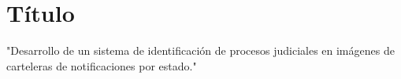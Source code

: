 \chapter{T\'itulo}
\label{sec:titulo}

"Desarrollo de un sistema de identificaci\'on de procesos judiciales en im\'agenes de carteleras de notificaciones por estado."

\pagebreak